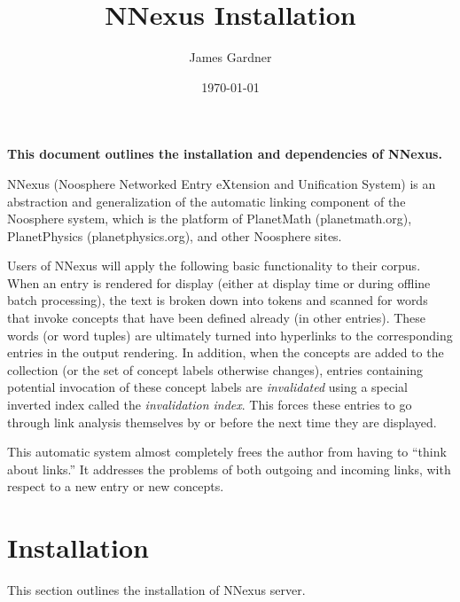 \documentclass[10pt]{article}
\begin{document}
\title{NNexus Installation}
\author{James Gardner}
\date{\today}
\maketitle


{\bf This document outlines the installation and dependencies of NNexus.}


NNexus (Noosphere Networked Entry eXtension and Unification System) is an abstraction and generalization of the automatic linking component of the Noosphere system, which is the platform of PlanetMath (planetmath.org), PlanetPhysics (planetphysics.org), and other Noosphere sites.

Users of NNexus will apply the following basic functionality to their corpus.  When an entry is rendered for display (either at display time or during offline batch processing), the text is broken down into tokens and scanned for words that invoke concepts that have been defined already (in other entries).  These words (or word tuples) are ultimately turned into hyperlinks to the corresponding entries in the output rendering.  
In addition, when the concepts are added to the collection (or the set of concept labels otherwise changes), entries containing potential invocation of these concept labels are \emph{invalidated} using a special inverted index called the \emph{invalidation index}.  This forces these entries to go through link analysis themselves by or before the next time they are displayed.

This automatic system almost completely frees the author from having to ``think about links.''  It addresses the problems of both outgoing and incoming links, with respect to a new entry or new concepts.


\section{Installation}
This section outlines the installation of NNexus server.
\end{document}
